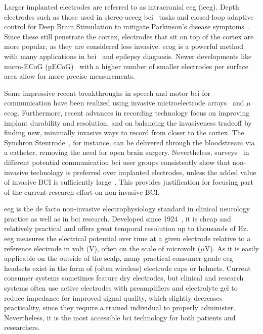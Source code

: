 Larger implanted electrodes are referred to as intracranial \ac{eeg} (i\ac{eeg}).
Depth electrodes such as those used in stereo-ac{eeg} \ac{bci}~\cite{Wu2024} tasks
and closed-loop adaptive control for Deep Brain Stimulation to mitigate
Parkinson's disease symptoms~\cite{Arlotti2018}.
Since these still penetrate the cortex, electrodes that sit on top of the
cortex are more popular, as they are considered less invasive.
\Ac{ecog} is a powerful method
with many applications in \ac{bci}~\cite{Schalk2011} and epilepsy diagnosis.
Newer developments like micro-ECoG (µECoG)~\cite{Shokoueinejad2019} with a
higher number of smaller electrodes per surface area allow for more precise
measurements.

Some impressive recent breakthroughs in speech and motor \ac{bci} for communication
 have been realized using
invasive mictroelectrode arrays~\cite{Willett2021} and $\mu$\Ac{ecog}\cite{Metzger2023}.
Furthermore, recent advances in recording technology focus on improving implant
durability and resolution, and on balancing the invasiveness
tradeoff by finding new, minimally invasive ways to record from closer to the cortex.
The Synchron Stentrode~\cite{Mitchell2023}, for instance, can be delivered
through the bloodstream via a catheter, removing the need for open brain
surgery.
Nevertheless, surveys~\cite{Huggins2011, Huggins2015, Branco2021} in different
potential communication \ac{bci} user groups consistently show that non-invasive
technology is preferred over implanted electrodes, unless the added value of invasive BCI is
sufficiently large~\cite{Kageyama2020}.
This provides justification for focusing part of the current research effort on
non-invasive BCI.

\Ac{eeg} is the de facto non-invasive electrophysiology standard in clinical
neurology practice as well as in \ac{bci} research.
Developed since 1924~\cite{Berger1929}, it is cheap and relatively practical and
offers great temporal resolution up to thousands of Hz.
\Ac{eeg} measures the electrical potential over time at a given electrode relative to a
reference electrode in volt (V), often on the scale of microvolt ($\mu$V).
As it is easily applicable on the outside of the scalp, many practical
consumer-grade \ac{eeg} headsets exist in the form of (often wireless) electrode
caps or helmets.
Current consumer systems sometimes feature dry electrodes, but clinical and
research systems often use active electrodes with preamplifiers and
electrolyte gel to reduce impedance for improved signal
quality, which slightly decreases practicality, since they require a trained
individual to properly administer.
Nevertheless, it is the most accessible \ac{bci} technology for both patients
and researchers.

